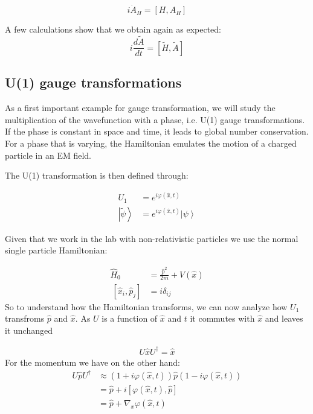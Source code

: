 \documentclass[10pt]{article}
\newcommand{\tpsi}{\tilde{\psi}}
\newcommand{\ket}[1]{\ensuremath{\left|#1\right\rangle}}
\begin{document}
\begin{equation}
i\dot{A}_H = [H,A_H]
\end{equation}

A few calculations show that we obtain again as expected:
\begin{equation}
i \frac{d\tilde{A}}{dt} =[\tilde{H},\tilde{A}]
\end{equation}

\subsection{U(1) gauge transformations}\label{Sec:U1Conti}
As a first important example for gauge transformation, we will study the multiplication of the wavefunction with a phase, i.e. U(1) gauge transformations. If the phase is constant in space and time, it leads to global number conservation. For a phase that is varying, the Hamiltonian emulates the motion of a charged particle in an EM field.

The U(1) transformation is then defined through:

\begin{eqnarray}
U_1 &= e^{i\varphi(\hat{x},t)}\\
\ket{\tpsi} &= e^{i\varphi(\hat{x},t)}\ket{\psi}
\end{eqnarray}

Given that we work in the lab with non-relativistic particles we use the normal single particle Hamiltonian:

\begin{eqnarray}
\hat{H}_0 &= \frac{\hat{p}^2}{2m}+V(\hat{x})\\
~[\hat{x}_i,\hat{p}_j] &= i\delta_{ij}
\end{eqnarray}
So to understand how the Hamiltonian transforms, we can now analyze how $U_1$ transfroms $\hat{p}$ and $\hat{x}$. As $U$ is a function of $\hat{x}$ and $t$ it commutes with $\hat{x}$ and leaves it unchanged

\begin{align}
U\hat{x}U^\dag = \hat{x}
\end{align}
For the momentum we have on the other hand:
\begin{eqnarray}
U\hat{p}U^\dag &\approx (1+i\varphi(\hat{x},t)) \hat{p}(1-i\varphi(\hat{x},t))\\
~ &= \hat{p} +i[\varphi(\hat{x},t),\hat{p}]\\
~ &= \hat{p}+\nabla_x \varphi(\hat{x},t)
\end{eqnarray}
\end{document}
